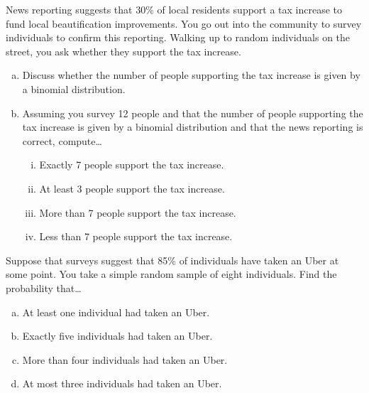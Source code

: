 \documentclass[11pt,letterpaper]{article}
\begin{document}

 News reporting suggests that 30\% of local residents support a tax increase to fund local beautification improvements. You go out into the community to survey individuals to confirm this reporting. Walking up to random individuals on the street, you ask whether they support the tax increase. 
	\begin{enumerate}[(a)]
	\item Discuss whether the number of people supporting the tax increase is given by a binomial distribution. 
	\item Assuming you survey 12 people and that the number of people supporting the tax increase is given by a binomial distribution and that the news reporting is correct, compute\dots
		\begin{enumerate}[(i)]
		\item Exactly 7 people support the tax increase.
		\item At least 3 people support the tax increase. 
		\item More than 7 people support the tax increase. 
		\item Less than 7 people support the tax increase.
		\end{enumerate}
	\end{enumerate}



\newpage



 Suppose that surveys suggest that 85\% of individuals have taken an Uber at some point. You take a simple random sample of eight individuals. Find the probability that\dots
	\begin{enumerate}[(a)]
	\item At least one individual had taken an Uber. 
	\item Exactly five individuals had taken an Uber. 
	\item More than four individuals had taken an Uber. 
	\item At most three individuals had taken an Uber. 
	\end{enumerate}
\end{document}

